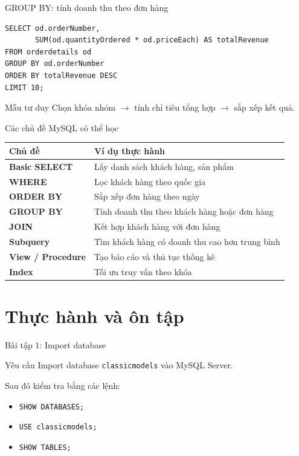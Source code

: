 \documentclass[aspectratio=169,professionalfonts]{beamer}
\newcommand{\code}[1]{\texttt{#1}}
\begin{document}
\begin{frame}[fragile]{GROUP BY: tính doanh thu theo đơn hàng}
\begin{lstlisting}[style=sqlstyle]
SELECT od.orderNumber,
       SUM(od.quantityOrdered * od.priceEach) AS totalRevenue
FROM orderdetails od
GROUP BY od.orderNumber
ORDER BY totalRevenue DESC
LIMIT 10;
\end{lstlisting}
\begin{block}{Mẫu tư duy}
Chọn khóa nhóm $\rightarrow$ tính chỉ tiêu tổng hợp $\rightarrow$ sắp xếp kết quả.
\end{block}
\end{frame}

\begin{frame}{Các chủ đề MySQL có thể học}
\small
\begin{tabularx}{\textwidth}{>{\bfseries}l X}
\toprule
Chủ đề & Ví dụ thực hành \\
\midrule
Basic SELECT & Lấy danh sách khách hàng, sản phẩm \\
WHERE & Lọc khách hàng theo quốc gia \\
ORDER BY & Sắp xếp đơn hàng theo ngày \\
GROUP BY & Tính doanh thu theo khách hàng hoặc đơn hàng \\
JOIN & Kết hợp khách hàng với đơn hàng \\
Subquery & Tìm khách hàng có doanh thu cao hơn trung bình \\
View / Procedure & Tạo báo cáo và thủ tục thống kê \\
Index & Tối ưu truy vấn theo khóa \\
\bottomrule
\end{tabularx}
\end{frame}

\section{Thực hành và ôn tập}

\begin{frame}{Bài tập 1: Import database}
\begin{block}{Yêu cầu}
Import database \code{classicmodels} vào MySQL Server.
\end{block}
Sau đó kiểm tra bằng các lệnh:
\begin{itemize}
  \item \code{SHOW DATABASES;}
  \item \code{USE classicmodels;}
  \item \code{SHOW TABLES;}
\end{itemize}
\end{frame}
\end{document}

